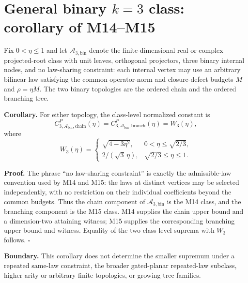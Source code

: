 \section*{General binary $k=3$ class: corollary of M14--M15}
\label{sec:m16-general-binary-class}

Fix $0<\eta\le1$ and let $\mathcal A_{3,\mathrm{bin}}$ denote the
finite-dimensional real or complex projected-root class with unit leaves,
orthogonal projectors, three binary internal nodes, and no law-sharing
constraint: each internal vertex may use an arbitrary bilinear law satisfying
the common operator-norm and closure-defect budgets $M$ and
$\rho=\eta M$.  The two binary topologies are the ordered chain and the
ordered branching tree.

\textbf{Corollary.}  For either topology, the class-level normalized constant
is
\[
  \boxed{
  C_{3,\mathcal A_{\mathrm{bin}},\mathrm{chain}}^P(\eta)
  =C_{3,\mathcal A_{\mathrm{bin}},\mathrm{branch}}^P(\eta)
  =W_3(\eta),
  }
\]
where
\[
 W_3(\eta)=
 \begin{cases}
 \sqrt{4-3\eta^2}, & 0<\eta\le\sqrt{2/3},\\[1mm]
 2/(\sqrt3\,\eta), & \sqrt{2/3}\le\eta\le1.
 \end{cases}
\]

\textbf{Proof.}  The phrase ``no law-sharing constraint'' is exactly the
admissible-law convention used by M14 and M15: the laws at distinct vertices
may be selected independently, with no restriction on their individual
coefficients beyond the common budgets.  Thus the chain component of
$\mathcal A_{3,\mathrm{bin}}$ is the M14 class, and the branching component
is the M15 class.  M14 supplies the chain upper bound and a dimension-two
attaining witness; M15 supplies the corresponding branching upper bound and
witness.  Equality of the two class-level suprema with $W_3$ follows.
\hfill$\square$

\textbf{Boundary.}  This corollary does not determine the smaller supremum
under a repeated same-law constraint, the broader gated-planar repeated-law
subclass, higher-arity or arbitrary finite topologies, or growing-tree
families.
